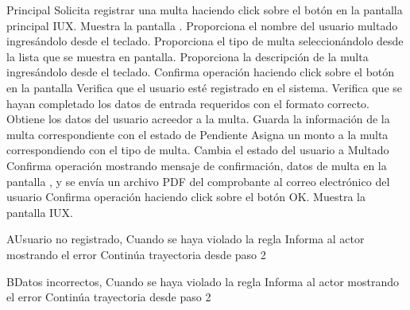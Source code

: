 	\begin{UCtrayectoria}{Principal}
		\UCpaso[\UCactor] Solicita registrar una multa haciendo click sobre el botón  en la pantalla principal IUX.
		\UCpaso Muestra la pantalla .
		\UCpaso[\UCactor] Proporciona el nombre del usuario multado ingresándolo desde el teclado.
		\UCpaso[\UCactor] Proporciona el tipo de multa seleccionándolo desde la lista que se muestra en pantalla.
		\UCpaso[\UCactor] Proporciona la descripción de la multa ingres\'andolo desde el teclado.
		\UCpaso[\UCactor] Confirma operación haciendo click sobre el botón  en la pantalla
		\UCpaso Verifica que el usuario esté registrado en el sistema.
		\UCpaso Verifica que se hayan completado los datos de entrada requeridos con el formato correcto.
		\UCpaso Obtiene los datos del usuario acreedor a la multa.
		\UCpaso Guarda la información de la multa correspondiente con el estado de Pendiente	
		\UCpaso Asigna un monto a la multa correspondiendo con el tipo de multa.     	
		\UCpaso Cambia el estado del usuario a Multado 
		\UCpaso Confirma operación mostrando mensaje de confirmación, datos de multa  en la pantalla , y se envía un archivo PDF del comprobante  al correo electrónico del usuario 
		\UCpaso[\UCactor] Confirma operación haciendo click sobre el botón OK.
		\UCpaso Muestra la pantalla IUX.	
\end{UCtrayectoria}

\begin{UCtrayectoriaA}{A}{Usuario no registrado,
Cuando se haya violado la regla }
	\UCpaso Informa al actor mostrando el error  
	\UCpaso Continúa trayectoria desde paso 2 
\end{UCtrayectoriaA}
			
		\begin{UCtrayectoriaA}{B}{Datos incorrectos,
Cuando se haya violado la regla }
	\UCpaso Informa al actor mostrando el error  
	\UCpaso Continúa trayectoria desde paso 2 
\end{UCtrayectoriaA}


